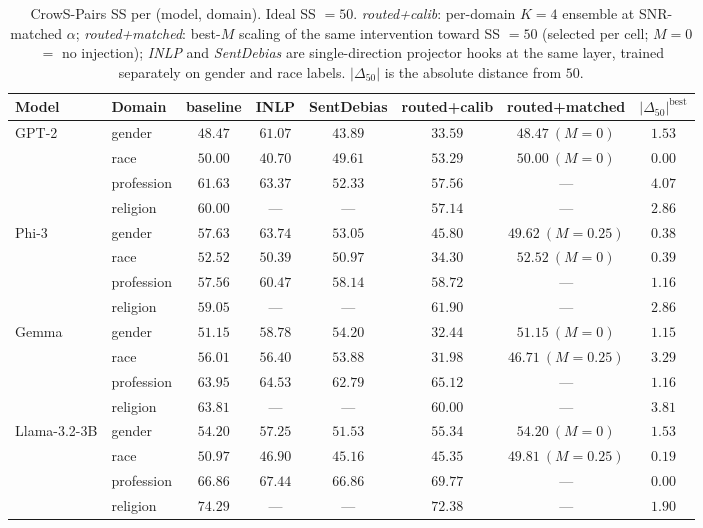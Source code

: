 \begin{table}[h]
\centering
\small
\caption{CrowS-Pairs SS per (model, domain). Ideal SS $=50$.
\emph{routed+calib}: per-domain $K{=}4$ ensemble at SNR-matched $\alpha$;
\emph{routed+matched}: best-$M$ scaling of the same intervention toward
SS $=50$ (selected per cell; $M{=}0$ $=$ no injection); \emph{INLP}
and \emph{SentDebias} are single-direction projector hooks at the same
layer, trained separately on gender and race labels.
$|\Delta_{50}|$ is the absolute distance from $50$.}
\label{tab:crowspairs}
\begin{tabular}{llcccccc}
\toprule
Model & Domain & baseline & INLP & SentDebias & routed+calib & routed+matched & $|\Delta_{50}|^{\text{best}}$ \\
\midrule
\multirow{4}{*}{GPT-2}
& gender     & $48.47$ & $61.07$ & $43.89$ & $33.59$ & $48.47\ (M{=}0)$     & $1.53$ \\
& race       & $50.00$ & $40.70$ & $49.61$ & $53.29$ & $50.00\ (M{=}0)$     & $0.00$ \\
& profession & $61.63$ & $63.37$ & $52.33$ & $57.56$ & ---                   & $4.07$ \\
& religion   & $60.00$ & ---     & ---     & $57.14$ & ---                   & $2.86$ \\
\midrule
\multirow{4}{*}{Phi-3}
& gender     & $57.63$ & $63.74$ & $53.05$ & $45.80$ & $\mathbf{49.62}\ (M{=}0.25)$ & $\mathbf{0.38}$ \\
& race       & $52.52$ & $50.39$ & $50.97$ & $34.30$ & $52.52\ (M{=}0)$      & $0.39$ \\
& profession & $57.56$ & $60.47$ & $58.14$ & $58.72$ & ---                   & $1.16$ \\
& religion   & $59.05$ & ---     & ---     & $61.90$ & ---                   & $2.86$ \\
\midrule
\multirow{4}{*}{Gemma}
& gender     & $51.15$ & $58.78$ & $54.20$ & $32.44$ & $51.15\ (M{=}0)$      & $1.15$ \\
& race       & $56.01$ & $56.40$ & $53.88$ & $31.98$ & $\mathbf{46.71}\ (M{=}0.25)$ & $\mathbf{3.29}$ \\
& profession & $63.95$ & $64.53$ & $62.79$ & $65.12$ & ---                   & $1.16$ \\
& religion   & $63.81$ & ---     & ---     & $60.00$ & ---                   & $3.81$ \\
\midrule
\multirow{4}{*}{Llama-3.2-3B}
& gender     & $54.20$ & $57.25$ & $51.53$ & $55.34$ & $54.20\ (M{=}0)$      & $1.53$ \\
& race       & $50.97$ & $46.90$ & $45.16$ & $45.35$ & $\mathbf{49.81}\ (M{=}0.25)$ & $\mathbf{0.19}$ \\
& profession & $66.86$ & $67.44$ & $66.86$ & $69.77$ & ---                   & $0.00$ \\
& religion   & $74.29$ & ---     & ---     & $72.38$ & ---                   & $1.90$ \\
\bottomrule
\end{tabular}
\end{table}

